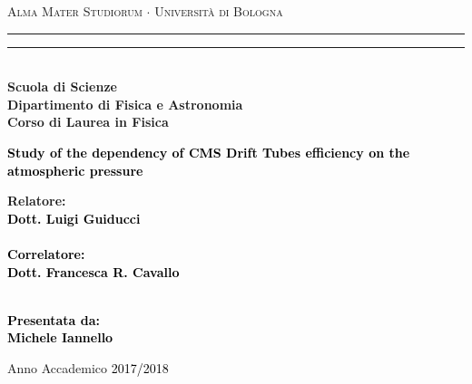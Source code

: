 \documentclass[12pt,twoside,a4paper]{report}
\numberwithin{equation}{section}
\begin{document}
\hypersetup{pageanchor=false}
\begin{titlepage}
%
%
%
%
\begin{center}
{{\Large{\textsc{Alma Mater Studiorum $\cdot$ Universit\`a di Bologna}}}} 
\rule[0.1cm]{15.8cm}{0.1mm}
\rule[0.5cm]{15.8cm}{0.6mm}
\\\vspace{3mm}
%
%
{\small{\bf Scuola di Scienze \\ 
Dipartimento di Fisica e Astronomia\\
Corso di Laurea in Fisica}}


\end{center}

\vspace{23mm}

\begin{center}\textcolor{black}{
%
%
{\LARGE{\bf Study of the dependency of CMS Drift Tubes efficiency on the atmospheric pressure}}\\
}\end{center}

\vspace{48mm} \par \noindent

\begin{minipage}[t]{0.47\textwidth}
%
%
{\large{\bf Relatore: \vspace{2mm}\\\textcolor{black}{
Dott. Luigi Guiducci}\\\\
%
%
%
\textcolor{black}{
\bf Correlatore:
\vspace{2mm}\\
Dott. Francesca R. Cavallo\\\\}}}
\end{minipage}
%
\hfill
%
\begin{minipage}[t]{0.47\textwidth}\raggedleft \textcolor{black}{
{\large{\bf Presentata da:
\vspace{2mm}\\
%
%
Michele Iannello}}}
\end{minipage}

\vspace{40mm}

\begin{center}
%
%
Anno Accademico \textcolor{black}{ 2017/2018}
\end{center}

\end{titlepage}
\end{document}
